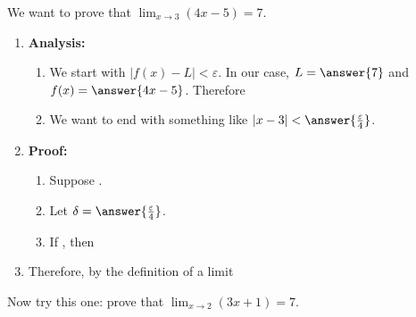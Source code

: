 \documentclass{ximera}
\begin{document}
\begin{example}\label{example:2-18}
We want to prove that $\lim_{x \rightarrow 3}(4x-5)=7$.
\begin{enumerate}
  \item \textbf{Analysis:}
  \begin{enumerate}
    \item We start with $|f(x)-L|<\varepsilon$. In our case, $L=\answer{7}$ and $f(x)=\answer{4x-5}$. Therefore
    \begin{freeResponse}\end{freeResponse}
    \item We want to end with something like $|x-3|<\answer{\frac{\varepsilon}{4}}$.
  \end{enumerate}
  \item \textbf{Proof:}
  \begin{enumerate}
    \item Suppose .
    \item Let $\delta=\answer{\frac{\varepsilon}{4}}$.
    \item If , then
    \begin{freeResponse}\end{freeResponse}
  \end{enumerate}
  \item Therefore, by the definition of a limit
  \begin{freeResponse}\end{freeResponse}
\end{enumerate}
\end{example}

\begin{exercise}\label{exercise:2-19}
Now try this one: prove that $\lim_{x \rightarrow 2}(3x+1)=7$.
\begin{freeResponse}\end{freeResponse}
\end{exercise}
\end{document}
